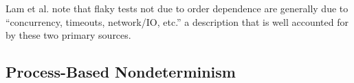 Lam et al. \cite{idflakies} note that flaky tests not due to order
dependence are generally due to ``concurrency, timeouts,
network/IO, etc.'' a description that is well accounted for by these two
primary sources.

\subsection{Process-Based Nondeterminism}

